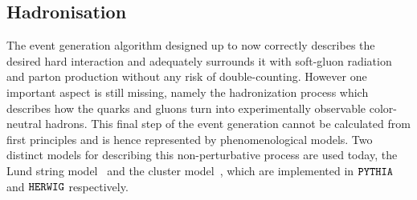 \subsection{Hadronisation} \label{sec::Hadronisation}
The event generation algorithm designed up to now correctly describes the desired hard interaction and adequately surrounds it with soft-gluon radiation and parton production without any risk of double-counting. However one important aspect is still missing, namely the hadronization process which describes how the quarks and gluons turn into experimentally observable color-neutral hadrons.
This final step of the event generation cannot be calculated from first principles and is hence represented by phenomenological models.
Two distinct models for describing this non-perturbative process are used today, the Lund string model~\cite{Lund} and the cluster model~\cite{ClusterModel}, which are implemented in $\texttt{PYTHIA}$ and $\texttt{HERWIG}$ respectively.

